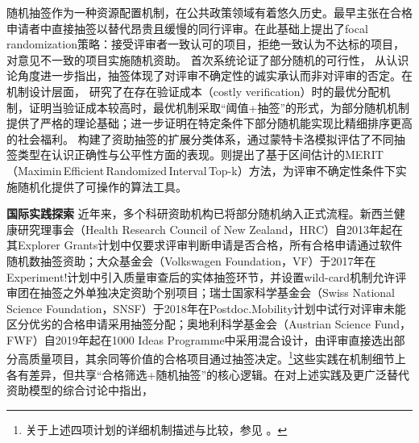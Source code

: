 
随机抽签作为一种资源配置机制，在公共政策领域有着悠久历史。\cite{greenberg1998chance}最早主张在合格申请者中直接抽签以替代昂贵且缓慢的同行评审。\cite{brezis2007focal}在此基础上提出了focal randomization策略：接受评审者一致认可的项目，拒绝一致认为不达标的项目，对意见不一致的项目实施随机资助。 \cite{fangResearchFundingCase2016}首次系统论证了部分随机的可行性， \cite{depeuterModifiedLotteryFormalizing2022}从认识论角度进一步指出，抽签体现了对评审不确定性的诚实承认而非对评审的否定。在机制设计层面， \cite{ben-porathOptimalAllocationCostly2014}研究了在存在验证成本（costly verification）时的最优分配机制，证明当验证成本较高时，最优机制采取“阈值+抽签”的形式，为部分随机机制提供了严格的理论基础；\cite{carnehlDesigningScientificGrants2025}进一步证明在特定条件下部分随机能实现比精细排序更高的社会福利。 \cite{felicianiFundingLotteriesResearch2024}构建了资助抽签的扩展分类体系，通过蒙特卡洛模拟评估了不同抽签类型在认识正确性与公平性方面的表现。\cite{goldbergPrincipledApproachRandomized2025}则提出了基于区间估计的MERIT（Maximin Efficient Randomized Interval Top-k）方法，为评审不确定性条件下实施随机化提供了可操作的算法工具。


\textbf{国际实践探索} \quad 近年来，多个科研资助机构已将部分随机纳入正式流程。新西兰健康研究理事会（Health Research Council of New Zealand，HRC）自2013年起在其Explorer Grants计划中仅要求评审判断申请是否合格，所有合格申请通过软件随机数抽签资助；大众基金会（Volkswagen Foundation，VF）于2017年在Experiment!计划中引入质量审查后的实体抽签环节，并设置wild-card机制允许评审团在抽签之外单独决定资助个别项目；瑞士国家科学基金会（Swiss National Science Foundation，SNSF）于2018年在Postdoc.Mobility计划中试行对评审未能区分优劣的合格申请采用抽签分配；奥地利科学基金会（Austrian Science Fund，FWF）自2019年起在1000 Ideas Programme中采用混合设计，由评审直接选出部分高质量项目，其余同等价值的合格项目通过抽签决定。\footnote{关于上述四项计划的详细机制描述与比较，参见 \cite{bendiscioli2022experimental}。}这些实践在机制细节上各有差异，但共享“合格筛选+随机抽签”的核心逻辑。\cite{gigerenzerAlternativeModelsFunding2025}在对上述实践及更广泛替代资助模型的综合讨论中指出，

